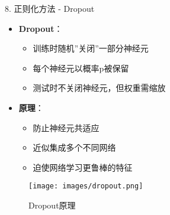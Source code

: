 \documentclass[
  ignorenonframetext,
  aspectratio=169,
  chinese-hans,
]{beamer}
\providecommand{\tightlist}{%
  \setlength{\itemsep}{0pt}\setlength{\parskip}{0pt}}\usepackage{longtable,booktabs,array}
\begin{document}
\begin{frame}{8. 正则化方法 - Dropout}
\label{ux6b63ux5219ux5316ux65b9ux6cd5---dropout}
\begin{itemize}
\tightlist
\item
  \textbf{Dropout}：

  \begin{itemize}
  \tightlist
  \item
    训练时随机''关闭''一部分神经元
  \item
    每个神经元以概率p被保留
  \item
    测试时不关闭神经元，但权重需缩放
  \end{itemize}
\item
  \textbf{原理}：

  \begin{itemize}
  \tightlist
  \item
    防止神经元共适应
  \item
    近似集成多个不同网络
  \item
    迫使网络学习更鲁棒的特征
  \end{itemize}
\end{itemize}

\begin{figure}[H]

{\centering \texttt{[image: images/dropout.png]}

}

\caption{Dropout原理}

\end{figure}%
\end{frame}
\end{document}
